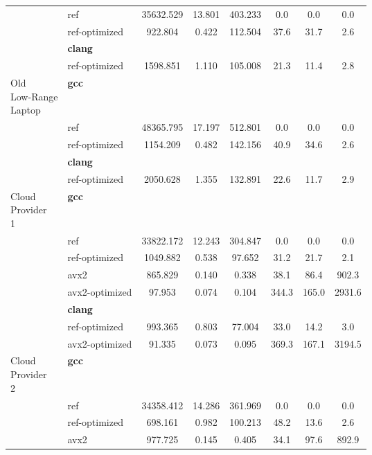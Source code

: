 \begin{table}[H]
\begin{tabularx}{\linewidth}{l l c c c c c c}
          & ref & 35632.529 & 13.801 & 403.233 & 0.0 & 0.0 & 0.0\\
          & ref-optimized & 922.804 & 0.422 & 112.504 & 37.6 & 31.7 & 2.6\\
          & \textbf{clang} & & & & & \\
          & ref-optimized & 1598.851 & 1.110 & 105.008 & 21.3 & 11.4 & 2.8\\
          \midrule
          \multirowcell{5}{Old\\ Low-Range\\ Laptop}
          & \textbf{gcc} & & & & & \\
          & ref & 48365.795 & 17.197 & 512.801 & 0.0 & 0.0 & 0.0\\
          & ref-optimized & 1154.209 & 0.482 & 142.156 & 40.9 & 34.6 & 2.6\\
          & \textbf{clang} & & & & & \\
          & ref-optimized & 2050.628 & 1.355 & 132.891 & 22.6 & 11.7 & 2.9\\
          \midrule
          \multirowcell{8}{Cloud\\ Provider\\ 1}
          & \textbf{gcc} & & & & & \\
          & ref & 33822.172 & 12.243 & 304.847 & 0.0 & 0.0 & 0.0\\
          & ref-optimized & 1049.882 & 0.538 & 97.652 & 31.2 & 21.7 & 2.1\\
          & avx2 & 865.829 & 0.140 & 0.338 & 38.1 & 86.4 & 902.3\\
          & avx2-optimized & 97.953 & 0.074 & 0.104 & 344.3 & 165.0 & 2931.6\\
          & \textbf{clang} & & & & & \\
          & ref-optimized & 993.365 & 0.803 & 77.004 & 33.0 & 14.2 & 3.0\\
          & avx2-optimized & 91.335 & 0.073 & 0.095 & 369.3 & 167.1 & 3194.5\\
          \midrule
          \multirowcell{8}{Cloud\\ Provider\\ 2}
          & \textbf{gcc} & & & & & \\
          & ref & 34358.412 & 14.286 & 361.969 & 0.0 & 0.0 & 0.0\\
          & ref-optimized & 698.161 & 0.982 & 100.213 & 48.2 & 13.6 & 2.6\\
          & avx2 & 977.725 & 0.145 & 0.405 & 34.1 & 97.6 & 892.9\\

\end{tabularx}
\end{table}
